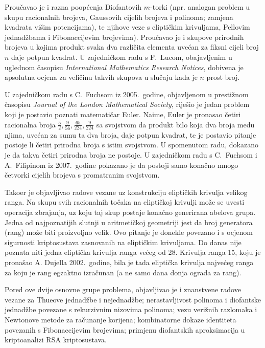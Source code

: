 \documentclass[11pt]{report}
\begin{document}
Prou\v{c}avao je i razna poop\'{c}enja Diofantovih $m$-torki (npr.
analogan problem u skupu racionalnih brojeva, Gaussovih
cijelih brojeva i polinoma; zamjena kvadrata
vi\v{s}im potencijama), te njihove veze s elipti\v{c}kim
krivuljama, Pellovim jednad\v{z}bama i Fibonaccijevim brojevima).
Prou\v{c}avao je i skupove
prirodnih brojeva u kojima produkt svaka dva razli\v{c}ita elementa
uve\'{c}an za fiksni cijeli broj $n$ daje potpun kvadrat. U zajedni\v{c}kom
radu s F.~Lucom, obajavljenim u uglednom \v{c}asopisu
{\it International Mathematics Research Notices}, dobivena je apsolutna
ocjena za veli\v{c}inu takvih skupova u slu\v{c}aju kada je $n$ prost broj.

U zajedni\v{c}kom radu s C.~Fuchsom iz 2005.~godine,
objavljenom u presti\v{z}nom \v{c}asopisu {\it Journal of the London Mathematical Society},
rije\v{s}io je jedan problem
koji je postavio poznati matemati\v{c}ar Euler.
Naime, Euler je pronasao \v{c}etiri racionalna broja
$\frac{5}{2}, \frac{9}{56}, \frac{65}{224}, \frac{9}{224}$ sa svojstvom da produkt bilo
koja dva broja medu njima, uve\'{c}an za sumu ta dva broja, daje potpun kvadrat,
te je postavio pitanje postoje li \v{c}etiri prirodna broja s istim svojstvom.
U spomenutom radu, dokazano je da takva \v{c}etiri prirodna broja ne postoje.
U zajedni\v{c}kom radu s C.~Fuchsom i A.~Filipinom iz 2007.~godine pokazano je da postoji
samo kona\v{c}no mnogo \v{c}etvorki cijelih brojeva s promatranim svojstvom.

Tako{\dj}er je objavljivao radove vezane uz konstrukciju elipti\v{c}kih krivulja velikog
ranga. Na skupu svih racionalnih to\v{c}aka na elipti\v{c}koj
krivulji mo\v{z}e se uvesti operacija zbrajanja, uz koju taj skup
postaje kona\v{c}no generirana abelova grupa. Jedna od
najpoznatijih slutnji u aritmeti\v{c}koj geometriji jest da broj
generatora (rang) mo\v{z}e biti proizvoljno velik. Ovo pitanje je
donekle povezano i s ocjenom sigurnosti kriptosustava zasnovanih
na elipti\v{c}kim krivuljama. Do danas nije poznata niti jedna
elipti\v{c}ka krivulja ranga ve\'{c}eg od 28.  Krivulja ranga 15, koju je prona\v{s}ao
A. Dujella 2002.~godine,
bila je tada elipti\v{c}ka krivulja najve\'{c}eg ranga za koju je rang egzaktno izra\v{c}unan
(a ne samo dana donja ograda za rang).

Pored ove dvije osnovne grupe problema, objavljivao je i
znanstvene radove vezane za Thueove jednad\v{z}be i
nejednad\v{z}be; nerastavljivost polinoma i diofantske jednad\v{z}be
povezane s rekurzivnim nizovima polinoma; vezu veri\v{z}nih razlomaka i
Newtonove metode za ra\v{c}unanje korijena; kombinatorne
dokaze identiteta povezanih s Fibonaccijevim brojevima;
primjenu diofantskih aproksimacija u kriptoanalizi RSA kriptosustava.
\end{document}
